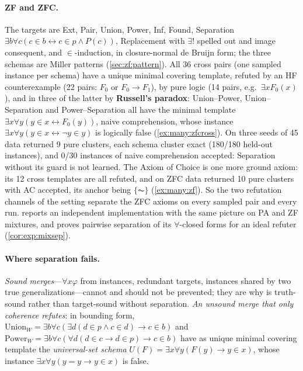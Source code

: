 \paragraph{ZF and ZFC.} The targets are Ext, Pair, Union, Power, Inf, Found, Separation $\exists b\forall c(c\in
b\leftrightarrow c\in p\wedge P(c))$, Replacement with $\exists!$ spelled out and image consequent, and $\in$-induction, in
closure-normal de Bruijn form; the three schemas are Miller patterns (\cref{sec:zf:pattern}). All 36 cross pairs (one sampled
instance per schema) have a unique minimal covering template, refuted by an HF counterexample (22 pairs: $F_0$ or $F_0\to
F_1$), by pure logic (14 pairs, e.g.\ $\exists xF_0(x)$), and in three of the latter by \textbf{Russell's paradox}:
Union--Power, Union--Separation and Power--Separation all have the minimal template $\exists x\forall y(y\in
x\leftrightarrow F_0(y))$, naive comprehension, whose instance $\exists x\forall y(y\in x\leftrightarrow\neg y\in y)$ is
logically false (\cref{ex:many:zfcross}). On three seeds of 45 data \DTRC{} returned 9 pure clusters, each schema cluster
exact (180/180 held-out instances), and 0/30 instances of naive comprehension accepted: Separation without its guard is not
learned. The Axiom of Choice is one more ground axiom: its 12 cross templates are all refuted, and on ZFC data \DTRC{}
returned 10 pure clusters with AC accepted, its anchor being $\{\AC\}$ (\cref{ex:many:zf}). So the two refutation channels
of the setting separate the ZFC axioms on every sampled pair and every run.  reports an independent
implementation with the same picture on PA and ZF mixtures, and proves pairwise separation of its $\forall$-closed forms for an ideal refuter (\cref{cor:exp:mixsep}).

\paragraph{Where separation fails.} \emph{Sound merges}---$\forall x\varphi$ from instances, redundant targets, instances
shared by two true generalizations---cannot and should not be prevented; they are why \DTRC{} is truth-sound rather than
target-sound without separation. \emph{An unsound merge that only coherence refutes}: in bounding form,
$\mathrm{Union}_W=\exists b\forall c(\exists d(d\in p\wedge c\in d)\to c\in b)$ and
$\mathrm{Power}_W=\exists b\forall c(\forall d(d\in c\to d\in p)\to c\in b)$ have as unique minimal covering template the
\emph{universal-set schema} $U(F)=\exists x\forall y(F(y)\to y\in x)$, whose instance $\exists x\forall y(y=y\to y\in x)$
is false.


